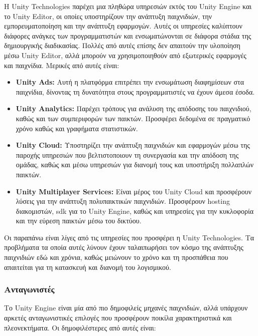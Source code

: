Η Unity Technologies παρέχει μια πληθώρα υπηρεσιών εκτός του Unity Engine και το Unity Editor, οι οποίες υποστηρίζουν την ανάπτυξη παιχνιδιών, την εμπορευματοποίηση και την ανάπτυξη εφαρμογών. Αυτές οι υπηρεσίες καλύπτουν διάφορες ανάγκες των προγραμματιστών και ενσωματώνονται σε διάφορα στάδια της δημιουργικής διαδικασίας. Πολλές από αυτές επίσης δεν απαιτούν την υλοποίηση μέσω Unity Editor, αλλά μπορούν να χρησιμοποιηθούν από εξωτερικές εφαρμογές και παιχνίδια. Μερικές από αυτές είναι:

\begin{itemize}
    \item \textbf{Unity Ads:} Αυτή η πλατφόρμα επιτρέπει την ενσωμάτωση διαφημίσεων στα παιχνίδια, δίνοντας τη δυνατότητα στους προγραμματιστές να έχουν άμεσα έσοδα\cite{noauthor_unity_nodate-1}.
    \item \textbf{Unity Analytics:} Παρέχει τρόπους για ανάλυση της απόδοσης του παιχνιδιού, καθώς και των συμπεριφορών των παικτών. Προσφέρει δεδομένα σε πραγματικό χρόνο καθώς και γραφήματα στατιστικών\cite{noauthor_game_nodate}.
    \item \textbf{Unity Cloud:} Υποστηρίζει την ανάπτυξη παιχνιδιών και εφαρμογών μέσω της παροχής υπηρεσιών που βελτιστοποιουν τη συνεργασία και την απόδοση της ομάδας, καθώς και μέσω υπηρεσιών για διανομή τους και υποστήριξη πολλαπλών παικτών\cite{noauthor_unity_nodate-3}.
    \item \textbf{Unity Multiplayer Services:} Είναι μέρος του Unity Cloud και προσφέρουν λύσεις για την ανάπτυξη πολυπαικτικών παιχνιδιών. Προσφέρουν hosting διακομιστών, \acrfull{sdk} για το Unity Engine, καθώς και υπηρεσίες για την κυκλοφορία και την εύρεση παικτών μέσω του δικτύου\cite{noauthor_multiplayer_nodate}.
\end{itemize}

Οι παραπάνω είναι λίγες από τις υπηρεσίες που προσφέρει η Unity Technologies. Τα προβλήματα τα οποία αυτές λύνουν έχουν ταλαιπωρήσει τον κόσμο της ανάπτυξης παιχνιδιών εδώ και χρόνια, καθώς μειώνουν το χρόνο και τη προσπάθεια που απαιτείται για τη κατασκευή και διανομή του λογισμικού\cite{al-said_ahmad_scalability_2019}.

\subsubsection{Ανταγωνιστές}

Το Unity Engine είναι μία από πιο δημοφιλείς μηχανές παιχνιδιών, αλλά υπάρχουν αρκετές ανταγωνιστικές επιλογές που προσφέρουν ποικίλα χαρακτηριστικά και πλεονεκτήματα\cite{leroux_best_2023}. Οι δημοφιλέστερες από αυτές είναι:

